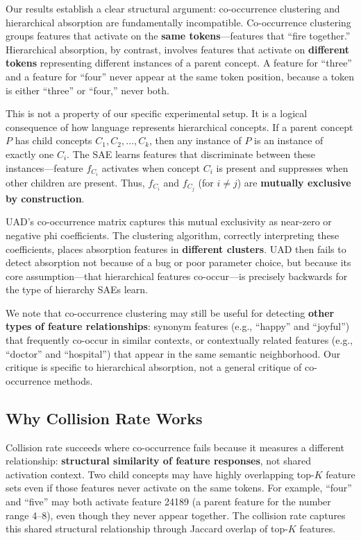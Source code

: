 \documentclass{article}
\begin{document}
Our results establish a clear structural argument: co-occurrence clustering and hierarchical absorption are fundamentally incompatible. Co-occurrence clustering groups features that activate on the \textbf{same tokens}---features that ``fire together.'' Hierarchical absorption, by contrast, involves features that activate on \textbf{different tokens} representing different instances of a parent concept. A feature for ``three'' and a feature for ``four'' never appear at the same token position, because a token is either ``three'' or ``four,'' never both.

This is not a property of our specific experimental setup. It is a logical consequence of how language represents hierarchical concepts. If a parent concept $P$ has child concepts $C_1, C_2, \ldots, C_k$, then any instance of $P$ is an instance of exactly one $C_i$. The SAE learns features that discriminate between these instances---feature $f_{C_i}$ activates when concept $C_i$ is present and suppresses when other children are present. Thus, $f_{C_i}$ and $f_{C_j}$ (for $i \neq j$) are \textbf{mutually exclusive by construction}.

UAD's co-occurrence matrix captures this mutual exclusivity as near-zero or negative phi coefficients. The clustering algorithm, correctly interpreting these coefficients, places absorption features in \textbf{different clusters}. UAD then fails to detect absorption not because of a bug or poor parameter choice, but because its core assumption---that hierarchical features co-occur---is precisely backwards for the type of hierarchy SAEs learn.

We note that co-occurrence clustering may still be useful for detecting \textbf{other types of feature relationships}: synonym features (e.g., ``happy'' and ``joyful'') that frequently co-occur in similar contexts, or contextually related features (e.g., ``doctor'' and ``hospital'') that appear in the same semantic neighborhood. Our critique is specific to hierarchical absorption, not a general critique of co-occurrence methods.

\subsection{Why Collision Rate Works}

Collision rate succeeds where co-occurrence fails because it measures a different relationship: \textbf{structural similarity of feature responses}, not shared activation context. Two child concepts may have highly overlapping top-$K$ feature sets even if those features never activate on the same tokens. For example, ``four'' and ``five'' may both activate feature 24189 (a parent feature for the number range 4--8), even though they never appear together. The collision rate captures this shared structural relationship through Jaccard overlap of top-$K$ features.
\end{document}
